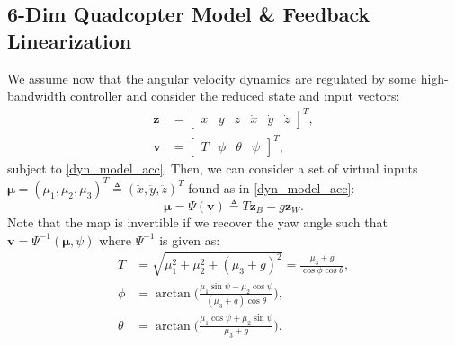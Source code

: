 \documentclass[journal,10pt]{IEEEtran}
\newcommand{\vect}[1]{\boldsymbol{\mathbf{#1}}}
\newcommand{\mat}[1]{\begin{bmatrix} #1 \end{bmatrix}}
\newif\ifdraft
\newcommand{\XX}[1]{\ifdraft{\color{red}[{\bf XX}: #1]}\fi}
\newcommand{\VF}[1]{\ifdraft{\color{blue}[{\bf VF}: #1]}\fi}
\begin{document}
\subsection{6-Dim Quadcopter Model \& Feedback Linearization}
We assume now that the angular velocity dynamics are regulated by some high-bandwidth controller and consider the reduced state and input vectors:%
\begin{subequations}
\begin{align}
    \vect{z}&= \mat{x & y & z & \dot{x} & \dot{y} & \dot{z}}^T,\\
    \vect{v} &= \mat{T & \phi & \theta &  \psi}^T,\label{reduced_input}
\end{align}
\end{subequations}
subject to \eqref{dyn_model_acc}. Then, we can consider a set of virtual inputs $\vect{\mu} =(\mu_1,\mu_2,\mu_3)^T\triangleq (\ddot{x},\ddot{y},\ddot{z})^T$ found as in \eqref{dyn_model_acc}:
\begin{equation} \label{def_Psi}
    \vect{\mu} = \Psi(\vect{v}) \triangleq T\vect{z}_B-g\vect{z}_W.
\end{equation}
Note that the map is invertible if we recover the yaw angle such that  $\vect{v} = \Psi^{-1}(\vect{\mu},\psi)$ where  $\Psi^{-1}$ is given as: %
\begin{subequations}
\begin{align}
    T &= \sqrt{\mu_1^2 + \mu_2^2 + (\mu_3+g)^2} = \frac{\mu_3+g}{\cos\phi \cos\theta},\label{inverpsi1}\\
    \phi &= \arctan\Big(\frac{\mu_1\sin\psi-\mu_2\cos\psi}{(\mu_3+g)\cos\theta}\Big),\label{inverpsi2}\\
    \theta&= \arctan\Big(\frac{\mu_1 \cos\psi + \mu_2 \sin\psi}{\mu_3+g}\Big).\label{inverpsi3}
\end{align}
\end{subequations}
\end{document}
